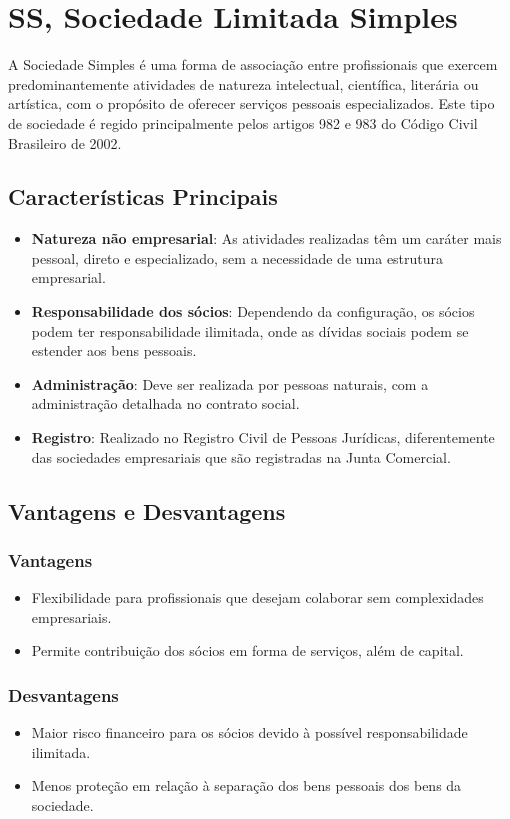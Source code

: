 \section{SS, Sociedade Limitada Simples}
A Sociedade Simples é uma forma de associação entre profissionais que exercem predominantemente atividades de natureza intelectual, científica, literária ou artística, com o propósito de oferecer serviços pessoais especializados. Este tipo de sociedade é regido principalmente pelos artigos 982 e 983 do Código Civil Brasileiro de 2002.

\subsection{Características Principais}
\begin{itemize}
    \item \textbf{Natureza não empresarial}: As atividades realizadas têm um caráter mais pessoal, direto e especializado, sem a necessidade de uma estrutura empresarial.
    \item \textbf{Responsabilidade dos sócios}: Dependendo da configuração, os sócios podem ter responsabilidade ilimitada, onde as dívidas sociais podem se estender aos bens pessoais.
    \item \textbf{Administração}: Deve ser realizada por pessoas naturais, com a administração detalhada no contrato social.
    \item \textbf{Registro}: Realizado no Registro Civil de Pessoas Jurídicas, diferentemente das sociedades empresariais que são registradas na Junta Comercial.
\end{itemize}

\subsection{Vantagens e Desvantagens}
\subsubsection{Vantagens}
\begin{itemize}
    \item Flexibilidade para profissionais que desejam colaborar sem complexidades empresariais.
    \item Permite contribuição dos sócios em forma de serviços, além de capital.
\end{itemize}

\subsubsection{Desvantagens}
\begin{itemize}
    \item Maior risco financeiro para os sócios devido à possível responsabilidade ilimitada.
    \item Menos proteção em relação à separação dos bens pessoais dos bens da sociedade.
\end{itemize}

